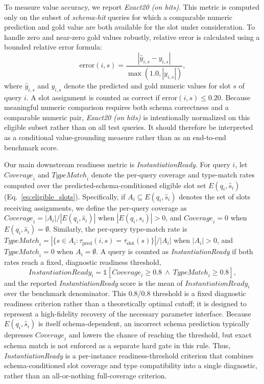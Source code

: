 \documentclass[3p]{elsarticle}
\begin{document}
To measure value accuracy, we report \textit{Exact20 (on hits)}. This metric is computed only on the subset of \emph{schema-hit} queries for which a comparable numeric prediction and gold value are both available for the slot under consideration. To handle zero and near-zero gold values robustly, relative error is calculated using a bounded relative error formula:
\begin{equation}
\mathrm{error}(i,s) = \frac{|\hat{y}_{i,s} - y_{i,s}|}{\max(1.0, |y_{i,s}|)},
\label{eq:bounded_error}
\end{equation}
where $\hat{y}_{i,s}$ and $y_{i,s}$ denote the predicted and gold numeric values for slot $s$ of query $i$. A slot assignment is counted as correct if $\mathrm{error}(i,s) \leq 0.20$. Because meaningful numeric comparison requires both schema correctness and a comparable numeric pair, \textit{Exact20 (on hits)} is intentionally normalized on this eligible subset rather than on all test queries. It should therefore be interpreted as a conditional value-grounding measure rather than as an end-to-end benchmark score.

Our main downstream readiness metric is \textit{InstantiationReady}. For query $i$, let $\mathit{Coverage}_i$ and $\mathit{TypeMatch}_i$ denote the per-query coverage and type-match rates computed over the predicted-schema-conditioned eligible slot set $E(q_i,\hat{s}_i)$ (Eq.~\eqref{eq:eligible_slots}). Specifically, if $A_i \subseteq E(q_i,\hat{s}_i)$ denotes the set of slots receiving assignments, we define the per-query coverage as $\mathit{Coverage}_i = |A_i| / |E(q_i,\hat{s}_i)|$ when $|E(q_i,\hat{s}_i)| > 0$, and $\mathit{Coverage}_i = 0$ when $E(q_i,\hat{s}_i) = \emptyset$. Similarly, the per-query type-match rate is $\mathit{TypeMatch}_i = |\{s \in A_i : \tau_{\mathrm{pred}}(i,s) = \tau_{\mathrm{slot}}(s)\}| / |A_i|$ when $|A_i| > 0$, and $\mathit{TypeMatch}_i = 0$ when $A_i = \emptyset$. A query is counted as \textit{InstantiationReady} if both rates reach a fixed, diagnostic readiness threshold,
\begin{equation}
\mathit{InstantiationReady}_i = \mathbb{1}\!\left[\mathit{Coverage}_i \geq 0.8 \ \wedge\ \mathit{TypeMatch}_i \geq 0.8\right],
\label{eq:instantiation_ready}
\end{equation}
and the reported \textit{InstantiationReady} score is the mean of $\mathit{InstantiationReady}_i$ over the benchmark denominator. This 0.8/0.8 threshold is a fixed diagnostic readiness criterion rather than a theoretically optimal cutoff; it is designed to represent a high-fidelity recovery of the necessary parameter interface. Because $E(q_i,\hat{s}_i)$ is itself schema-dependent, an incorrect schema prediction typically depresses $\mathit{Coverage}_i$ and lowers the chance of reaching the threshold, but exact schema match is not enforced as a separate hard gate in this rule. Thus, \textit{InstantiationReady} is a per-instance readiness-threshold criterion that combines schema-conditioned slot coverage and type compatibility into a single diagnostic, rather than an all-or-nothing full-coverage criterion.
\end{document}
